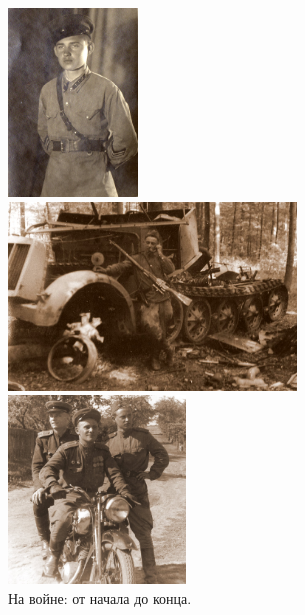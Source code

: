 \documentclass[utf8x, 12pt]{G7-32a} %
\begin{document}
\vspace{5pt}

\begin{figure}[h!]
    \begin{minipage}[h!]{45mm}
         \vspace{10pt}
         \begin{center}
         \vspace{-15pt}
         \includegraphics[height=50mm]{inc/Varzar/41.jpg} 
         \end{center}
         \vspace{-10pt}
    \end{minipage}
    \hfill
   \begin{minipage}[h]{65mm}
       \begin{center}
       \includegraphics[height=50mm]{inc/Varzar/42.jpg} 
       \end{center}
   \end{minipage}
   \hfill
    \begin{minipage}[h!]{45mm}
        \begin{center}
        \includegraphics[height=50mm]{inc/Varzar/43a.jpg}
        \end{center}
    \end{minipage}
    \caption{На войне: от начала до конца.}
\end{figure}

\vspace{-20pt}


\mainmatter %



\backmatter %



\appendix   %
\end{document}
